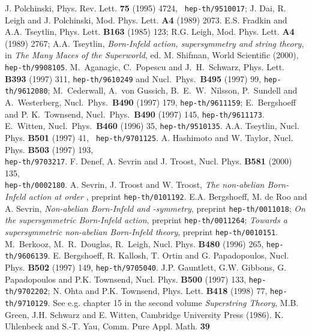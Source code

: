 \documentclass[a4paper,12pt,oneside]{article}
\begin{document}
\begin{thebibliography}{99}
 J. Polchinski, Phys. Rev. Lett. {\bf 75} (1995) 4724, {\tt 
hep-th/9510017}; J. Dai, R. Leigh and J. Polchinski, Mod. Phys. Lett. {\bf 
A4} (1989) 2073.
 E.S. Fradkin and A.A. Tseytlin, Phys. Lett. {\bf B163} (1985) 
123; R.G. Leigh, Mod. Phys. Lett. {\bf A4} (1989) 2767; A.A. 
Tseytlin, {\em Born-Infeld action, supersymmetry and string theory}, in 
{\em The Many Maces of the Superworld}, ed. M. Shifman, World Scientific 
(2000), {\tt hep-th/9908105}.
  M.~Aganagic, C.~Popescu and J.~H.~Schwarz,
Phys. Lett. {\bf B393} (1997) 311, {\tt hep-th/9610249} and
Nucl.~Phys.~{\bf B495} (1997) 99, {\tt hep-th/9612080};
M.~Cederwall, A.~von Gussich, B.~E.~W.~Nilsson, P.~Sundell and A.~Westerberg,
Nucl.~Phys.~{\bf B490} (1997) 179, {\tt hep-th/9611159};
E.~Bergshoeff and P. K.~Townsend, Nucl.~Phys.~{\bf B490} (1997) 145,
{\tt hep-th/9611173}.
  E.~Witten, Nucl.~Phys.~{\bf B460} (1996) 35,
{\tt hep-th/9510135}.
A.A. Tseytlin, Nucl. Phys. {\bf B501} (1997) 41, {\tt
hep-th/9701125}.
 A. Hashimoto and W. Taylor, Nucl. Phys. {\bf B503} (1997)
193,\\ {\tt hep-th/9703217}.
  F. Denef, A. Sevrin and J. Troost, Nucl. Phys. {\bf B581}
 (2000) 135,\\ {\tt hep-th/0002180}.
 A. Sevrin, J. Troost and W. Troost,
{\em The non-abelian Born-Infeld action at order \coordHE{}}, 
preprint {\tt hep-th/0101192}.
 E.A. Bergshoeff, M. de Roo and A. Sevrin, 
{\em Non-abelian Born-Infeld and \myHighlight{$\kappa$}\coordHE{}-symmetry}, preprint
{\tt hep-th/0011018};
{\em On the supersymmetric Born-Infeld action}, preprint {\tt hep-th/0011264}; 
{\em Towards a supersymmetric non-abelian Born-Infeld theory},  preprint {\tt hep-th/0010151}.
  M.~Berkooz, M.~R.~Douglas, R.~Leigh,
Nucl. Phys. {\bf B480} (1996) 265, {\tt hep-th/9606139}.
 E. Bergshoeff, R. Kallosh, T. Ortin and G. Papadopoulos, 
Nucl. Phys. {\bf B502} (1997) 149, {\tt hep-th/9705040}.
 J.P. Gauntlett, G.W. Gibbons, G. Papadopoulos and P.K. 
Townsend, Nucl. Phys. {\bf B500} (1997) 133, {\tt hep-th/9702202}; N. Ohta 
and P.K. Townsend, Phys. Lett. {\bf B418} (1998) 77, {\tt hep-th/9710129}.
 See e.g. chapter 15 in the second volume {\em Superstring Theory},
M.B. Green, J.H. Schwarz and E. Witten, Cambridge University Press (1986).
 K. Uhlenbeck and S.-T. Yau, Comm. Pure Appl. Math. {\bf 39} 

\end{thebibliography}
\end{document}
